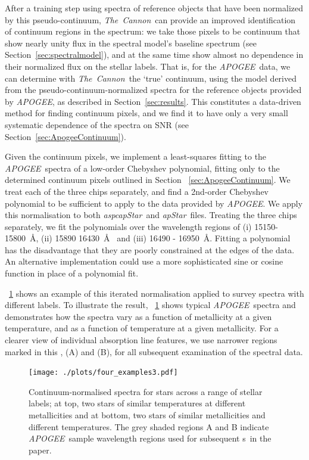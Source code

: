 \documentclass[12pt, preprint]{aastex}
\newcommand{\sectionname}{Section}
\newcommand{\figurenames}{\figurename s}
\newcommand{\tc}{\textsl{The~Cannon}}
\newcommand{\apogee}{\textsl{APOGEE}}
\newcommand{\aspcapstar}{\textsl{aspcapStar}}
\newcommand{\apstar}{\textsl{apStar}}
\begin{document}
After a training step using spectra of reference objects that have been  normalized  by this pseudo-continuum,
 \tc\ can provide an improved identification of continuum regions in the spectrum: 
we take those pixels to be continuum that show nearly unity flux in the spectral model's baseline spectrum (see \sectionname~\ref{sec:spectralmodel}), and at the same time show almost no dependence in their normalized flux on the stellar labels.
That is, for the \apogee\ data, we can determine with \tc\ the `true' continuum, using the model derived from the pseudo-continuum-normalized spectra for the reference objects provided by \apogee, as described in \sectionname~\ref{sec:results}. This constitutes a data-driven method for finding continuum pixels, and we find it to have only a very small systematic dependence of the spectra on SNR (see \sectionname~\ref{sec:ApogeeContinuum}).

Given the continuum pixels, we implement a least-squares fitting to the \apogee\ spectra of a low-order Chebyshev polynomial, fitting only to the determined continuum pixels outlined in Section ~\ref{sec:ApogeeContinuum}. We treat each of the three chips separately, and find a 2nd-order Chebyshev polynomial to be sufficient to apply to the data provided by \apogee. We apply this normalisation to both \aspcapstar\ and \apstar\ files. Treating the three chips separately, we fit the polynomials over the wavelength regions of (i) 15150-15800~\AA, (ii) 15890 16430~\AA~ and (iii) 16490 - 16950~\AA. Fitting a polynomial has the disadvantage that they are poorly constrained at the edges of the data. An alternative implementation could use a more sophisticated sine or cosine function in place of a polynomial fit. 

\figurename~\ref{fig:norm} shows an example of this iterated normalisation applied to survey spectra with different labels. To illustrate the result, \figurename~\ref{fig:norm} shows typical \apogee\ spectra and demonstrates how the spectra 
vary as a function of metallicity at a given temperature, and as a function of temperature at a given metallicity. 
For a clearer view of individual absorption line features, we use narrower regions marked in this \figurename, (A) and (B), for all subsequent examination of the spectral data. 

\begin{figure}[h!]
  \texttt{[image: ./plots/four\_examples3.pdf]}
\caption{Continuum-normalised spectra for stars across a range of stellar labels; at top, two stars of similar temperatures at different metallicities and at bottom, two stars of similar metallicities and different temperatures. The grey shaded regions A and B indicate \apogee\ sample wavelength regions used for subsequent \figurenames\ in the paper.}
\label{fig:norm}
\end{figure}
\end{document}
